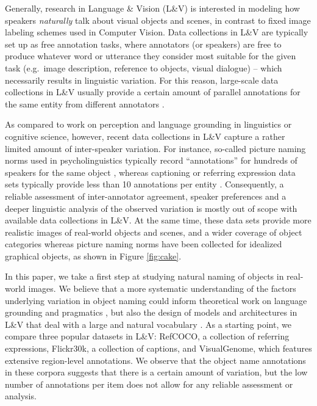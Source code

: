 
Generally, research in Language \& Vision (L\&V) is interested in modeling how speakers \textit{naturally} talk about visual objects and scenes, in contrast to fixed image labeling schemes used in Computer Vision. 
Data collections in L\&V are typically set up as free annotation tasks,  where annotators (or speakers) are free to produce whatever word or utterance they consider most suitable for the given task (e.g.\ image description, reference to objects, visual dialogue) -- which necessarily results in linguistic variation.
For this reason, large-scale data collections in L\&V usually provide a certain amount of parallel annotations for the same entity from different annotators \cite{fangetal:2015,devlin:imcaqui,Kazemzadeh2014,mao15,vries2017guesswhat}.

As compared to work on perception and language grounding in linguistics or cognitive science, however, recent data collections in L\&V capture a rather limited amount of inter-speaker variation.
For instance, so-called picture naming norms used in psycholinguistics typically record ``annotations'' for hundreds of speakers for the same object  \cite{snodgrass,rossion2004revisiting}, whereas captioning or referring expression data sets typically provide less than 10 annotations per entity \cite{devlin:imcaqui,Kazemzadeh2014,mao15}.
Consequently, a reliable assessment of inter-annotator agreement, speaker preferences and a deeper linguistic analysis of the observed variation is mostly out of scope with available data collections in  L\&V.
At the same time, these data sets provide more realistic images of real-world objects and scenes, and a wider coverage of object categories whereas picture naming norms have been collected for idealized graphical objects, as shown in Figure \ref{fig:cake}.

In this paper, we take a first step at studying natural naming of objects in real-world images. We believe that a more systematic understanding of the factors underlying variation in object naming could inform theoretical work on language grounding and pragmatics \cite{rohde2012communicating,graf2016animal}, but also the design of models and architectures in L\&V that deal with a large and natural vocabulary \cite{lazaridou-dinu-baroni:2015:ACL-IJCNLP,Ordonez:2016,zhao2017open}. As a starting point, we compare three popular datasets in  L\&V: RefCOCO, a collection of referring expressions, Flickr30k, a collection of captions, and VisualGenome, which features extensive region-level annotations. We observe that the object name annotations in these corpora suggests that there is a certain amount of variation, but the low number of annotations per item does not allow for any reliable assessment or analysis. 


